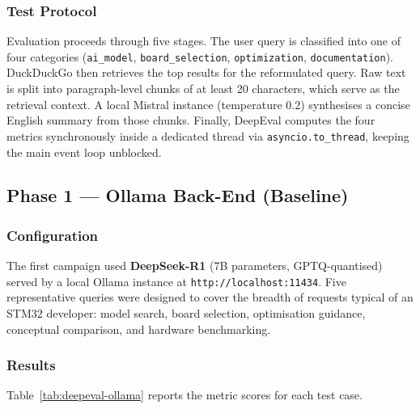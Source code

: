 \subsubsection{Test Protocol}
Evaluation proceeds through five stages. The user query is classified into one of four categories (\texttt{ai\_model}, \texttt{board\_selection}, \texttt{optimization}, \texttt{documentation}). DuckDuckGo then retrieves the top results for the reformulated query. Raw text is split into paragraph-level chunks of at least 20 characters, which serve as the retrieval context. A local Mistral instance (temperature 0.2) synthesises a concise English summary from those chunks. Finally, DeepEval computes the four metrics synchronously inside a dedicated thread via \texttt{asyncio.to\_thread}, keeping the main event loop unblocked.

\subsection{Phase 1 --- Ollama Back-End (Baseline)}

\subsubsection{Configuration}
The first campaign used \textbf{DeepSeek-R1} (7B parameters, GPTQ-quantised) served by a local Ollama instance at \texttt{http://localhost:11434}. Five representative queries were designed to cover the breadth of requests typical of an STM32 developer: model search, board selection, optimisation guidance, conceptual comparison, and hardware benchmarking.

\subsubsection{Results}
Table~\ref{tab:deepeval-ollama} reports the metric scores for each test case.


